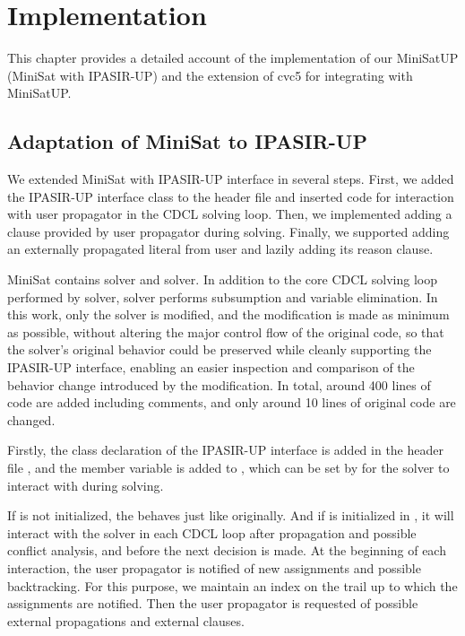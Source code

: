 \chapter{Implementation}

This chapter provides a detailed account of the implementation of our MiniSatUP (MiniSat with IPASIR-UP) and the extension of cvc5 for integrating with MiniSatUP.

\section{Adaptation of MiniSat to IPASIR-UP}

We extended MiniSat with IPASIR-UP interface in several steps. First, we added the IPASIR-UP interface class to the header file and inserted code for interaction with user propagator in the CDCL solving loop. Then, we implemented adding a clause provided by user propagator during solving. Finally, we supported adding an externally propagated literal from user and lazily adding its reason clause.

MiniSat contains  solver and  solver. In addition to the core CDCL solving loop performed by  solver,  solver performs subsumption and variable elimination. In this work, only the  solver is modified, and the modification is made as minimum as possible, without altering the major control flow of the original code, so that the solver's original behavior could be preserved while cleanly supporting the IPASIR-UP interface, enabling an easier inspection and comparison of the behavior change introduced by the modification. In total, around 400 lines of code are added including comments, and only around 10 lines of original code are changed.

Firstly, the  class declaration of the IPASIR-UP interface is added in the header file , and the  member variable is added to , which can be set by  for the solver to interact with during solving.

If  is not initialized, the  behaves just like originally. And if  is initialized in , it will interact with the solver in each CDCL loop after propagation and possible conflict analysis, and before the next decision is made. At the beginning of each interaction, the user propagator is notified of new assignments and possible backtracking. For this purpose, we maintain an index on the trail up to which the assignments are notified. Then the user propagator is requested of possible external propagations and external clauses.

